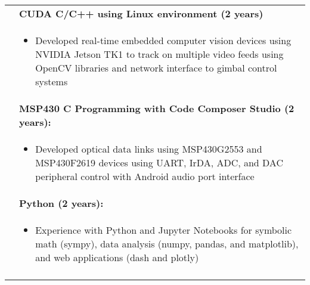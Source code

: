 \begin{tabular}{L{\hlcolw}  L{\rcolw}}
	
	& \textbf{CUDA C/C++ using Linux environment (2 years)}\\
	&
	\vspace{-0.25in}
	\begin{itemize}[leftmargin = \itemmargin]
		\item Developed real-time embedded computer vision devices using NVIDIA Jetson TK1 to track on multiple video feeds using OpenCV libraries and network interface to gimbal control systems
	\end{itemize} \\
	
	& \textbf{MSP430 C Programming with Code Composer Studio (2 years):} \\
	&
	\vspace{-0.25in}
	\begin{itemize}[leftmargin = \itemmargin]
		\item Developed optical data links using MSP430G2553 and MSP430F2619 devices using UART, IrDA, ADC, and DAC peripheral control with Android audio port interface
	\end{itemize} \\
	
	& \textbf{Python (2 years):} \\
	&
	\vspace{-0.3in}
	\begin{itemize}[leftmargin = \itemmargin]
		\item Experience with Python and Jupyter Notebooks for symbolic math (sympy), data analysis (numpy, pandas, and matplotlib), and web applications (dash and plotly)
	\end{itemize}
	
	\\
	
	\hline \\
\end{tabular}